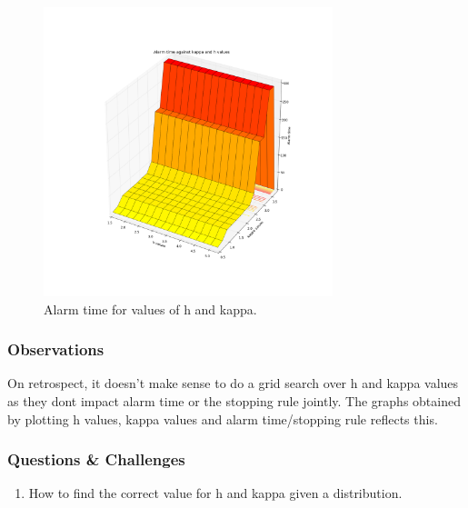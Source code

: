 \documentclass{article}
\begin{document}
\begin{figure}[ht!]
  \centering
  \includegraphics[width=0.75\textwidth]{images/1d_online/alarm}
  \caption{Alarm time for values of h and kappa.\label{fig:1d_o_alarm}}
\end{figure}

\subsubsection{Observations}
On retrospect, it doesn't make sense to do a grid search over h and kappa values as they dont impact alarm time or the stopping rule jointly.  The graphs obtained by plotting h values, kappa values and alarm time/stopping rule reflects this.

\subsubsection{Questions \& Challenges}
\begin{enumerate}
  \item How to find the correct value for h and kappa given a distribution.
\end{enumerate}

\newpage



\end{document}
